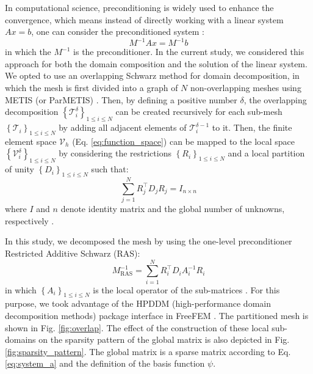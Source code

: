 In computational science, preconditioning is widely used to enhance the convergence, which means instead of directly working with a linear system $Ax=b$, one can consider the preconditioned system \cite{Daas2019AMS}:
\begin{equation} \label{eq:precond_system}
M^{-1} A x=M^{-1} b
\end{equation}
in which the $M^{-1}$ is the preconditioner. In the current study, we considered this approach for both the domain composition and the solution of the linear system. We opted to use an overlapping Schwarz method for domain decomposition, in which the mesh is first divided into a graph of $N$ non-overlapping meshes using METIS (or ParMETIS) \cite{METIS1998}. Then, by defining a positive number $\delta$, the overlapping decomposition $\left\{\mathcal{T}_{i}^{\delta}\right\}_{1 \leqslant i \leqslant N}$ can be created recursively for each sub-mesh $\left\{\mathcal{T}_{i}\right\}_{1 \leqslant i \leqslant N}$ by adding all adjacent elements of $\mathcal{T}_{i}^{\delta-1}$ to it. Then, the finite element space $\mathcal{V}_{h}$ (Eq. \ref{eq:function_space}) can be mapped to the local space $\left\{\mathcal{V}_{i}^{\delta}\right\}_{1 \leqslant i \leqslant N}$ by considering the restrictions $\left\{R_{i}\right\}_{1 \leqslant i \leqslant N}$ and a local partition of unity $\left\{D_{i}\right\}_{1 \leqslant i \leqslant N}$ such that:
\begin{equation} \label{eq:restrict}
\sum_{j=1}^{N} R_{j}^{\top} D_{j} R_{j}=I_{n \times n}
\end{equation}
where $I$ and $n$ denote identity matrix and the global number of unknowns, respectively \cite{Dolean2015}.

In this study, we decomposed the mesh by using the one-level preconditioner Restricted Additive Schwarz (RAS):
\begin{equation} \label{eq:ras}
M_{\mathrm{RAS}}^{-1}=\sum_{i=1}^{N} R_{i}^{\top} D_{i} A_{i}^{-1} R_{i}
\end{equation}
in which $\left\{A_{i}\right\}_{1 \leqslant i \leqslant N}$ is the local operator of the sub-matrices \cite{Dolean2015}. For this purpose, we took advantage of the \gls{HPDDM} (high-performance domain decomposition methods) package interface in FreeFEM \cite{Jolivet2013}. The partitioned mesh is shown in Fig. \ref{fig:overlap}. The effect of the construction of these local sub-domains on the sparsity pattern of the global matrix is also depicted in Fig. \ref{fig:sparsity_pattern}. The global matrix is a sparse matrix according to Eq. \ref{eq:system_a} and the definition of the basis function $\psi$.

